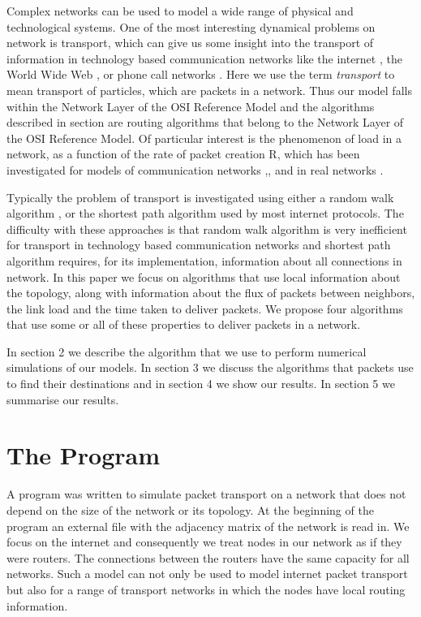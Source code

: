 \documentclass[runningheads]{llncs}
\begin{document}
Complex networks can be used to model a wide range of physical and
technological systems. One of the most interesting dynamical
problems on network is transport, which can give us some insight
into the transport of information in technology based communication
networks like the internet \cite{faloutsos}, the World Wide Web
\cite{albert},\cite{Huberman} or phone call networks \cite{Adamic}.
Here we use the term \emph{transport} to mean transport of particles, which
are packets in a network. Thus our model falls within the Network
Layer of the OSI Reference Model and the algorithms described in
section  are routing algorithms that belong to the Network Layer
of the OSI Reference Model. Of particular interest is the phenomenon
of load in a network, as a function of the rate of packet creation
R, which has been investigated for models of communication networks
\cite{Tadic},\cite{Arenas},\cite{Sole} and in real networks
\cite{Jacobson}.

Typically the problem of transport is investigated using either a random
walk algorithm \cite{Tadic}, or the shortest path algorithm used by
most internet protocols. The difficulty with these approaches is
that random walk algorithm is very inefficient for transport in
technology based communication networks and shortest path algorithm
requires, for its implementation, information about all connections
in network. In this paper we focus on algorithms that use local
information about the topology, along with information about the flux of
packets between neighbors, the link load and the time taken to deliver
packets. We propose four algorithms that use some or all of these
properties to deliver packets in a network.

In section 2 we describe the algorithm that we use to perform numerical
simulations of our models. In section 3 we discuss the algorithms that
packets use to find their destinations and in section 4 we show our results.
In section 5 we summarise our results.



\section{The Program}
A program was written to simulate packet transport on a network that
does not depend on the size of the network or its
topology. At the beginning of the program an external file with
the adjacency matrix of the network is read in.
We focus on the internet and
consequently we treat nodes in our network as if they were routers.
The connections between the routers
have the same capacity for all networks. Such a model can
not only be used to model internet packet transport but also for a range of
transport networks in which the nodes have local routing information.
\end{document}
